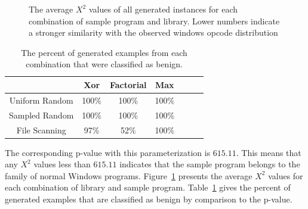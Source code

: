     \begin{figure}[t!]
        \vspace{-50pt}
        \caption{The average $X^2$ values of all generated instances for
            each combination of sample program and library. Lower numbers
            indicate a stronger similarity with the observed windows opcode
            distribution}
        \label{tab:results-windows-like-avg}
    \end{figure}

    \begin{table}
        \centering
        \begin{tabular}{|c||c|c|c|c|c|c|}
            \hline
                            & Xor & Factorial & Max \\
            \hline
            Uniform Random  & 100\% & 100\% & 100\%\\
            \hline
            Sampled Random  & 100\% & 100\% & 100\%\\
            \hline
            File Scanning   & 97\% & 52\% & 100\% \\
            \hline
        \end{tabular}
        \caption{The percent of generated examples from each combination
            that were classified as benign.}
        \label{tab:results-windows-like-passed}
    \end{table}

    The corresponding p-value with this parameterization is $615.11$. This
    means that any $X^2$ values less than $615.11$ indicates that the sample
    program belongs to the family of normal Windows programs.
    Figure~\ref{tab:results-windows-like-avg} presents the average $X^2$
    values for each combination of library and sample program.
    Table~\ref{tab:results-windows-like-passed} gives the percent of
    generated examples that are classified as benign by comparison to the
    p-value.


